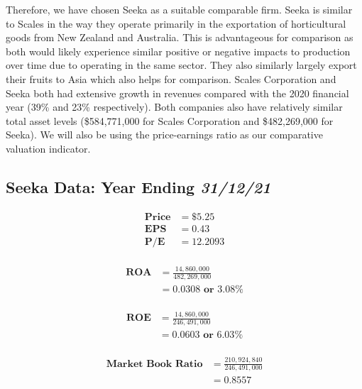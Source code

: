 \documentclass{article}
\begin{document}
Therefore, we have chosen Seeka as a suitable comparable firm. Seeka is similar to Scales in the way they operate primarily in the exportation of horticultural goods from New Zealand and Australia. This is advantageous for comparison as both would likely experience similar positive or negative impacts to production over time due to operating in the same sector. They also similarly largely export their fruits to Asia which also helps for comparison. Scales Corporation and Seeka both had extensive growth in revenues compared with the 2020 financial year (39\% and 23\% respectively). Both companies also have relatively similar total asset levels (\$584,771,000 for Scales Corporation and \$482,269,000 for Seeka).
\newline
We will also be using the price-earnings ratio as our comparative valuation indicator. 

\subsection{Seeka Data: Year Ending \textit{31/12/21}} 

\begin{equation*}
\begin{split}
\textbf{Price} &= \$5.25\\
\textbf{EPS}   &= 0.43\\
\textbf{P/E}   &= 12.2093\\
\end{split}
\end{equation*}

\begin{equation*}
\begin{split}
\textbf{ROA} &= \frac{14,860,000}{482,269,000} \\
             &= 0.0308 \textbf{ or } 3.08\% \\
\end{split}
\end{equation*}

\begin{equation*}
\begin{split}
\textbf{ROE} &= \frac{14,860,000}{246,491,000} \\
             &= 0.0603 \textbf{ or } 6.03\% \\
\end{split}
\end{equation*}

\begin{equation*}
\begin{split}
\textbf{Market Book Ratio}  &=\frac{210,924,840}{246,491,000} \\
                            &= 0.8557 \\
\end{split}
\end{equation*}
\end{document}
